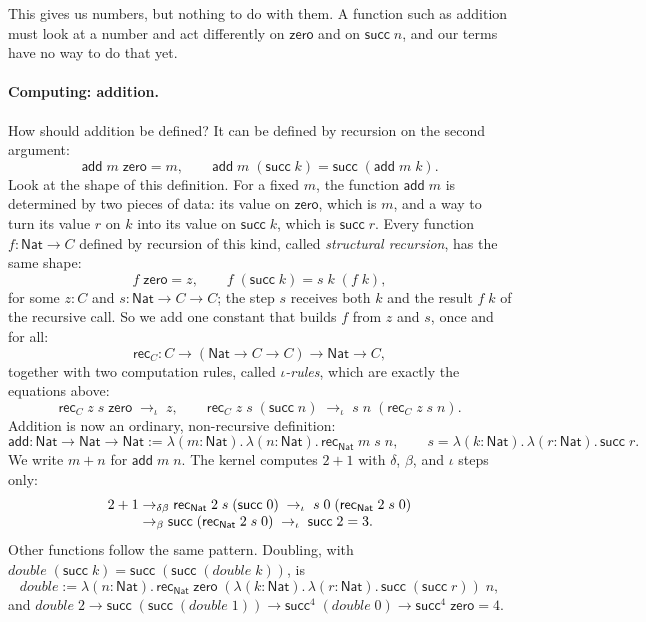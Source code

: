 \documentclass[acmsmall,screen,nonacm]{acmart}
\newcommand{\tLam}[3]{\lambda(#1{:}#2).\,#3}
\newcommand{\Nat}{\mathsf{Nat}}
\newcommand{\zero}{\mathsf{zero}}
\newcommand{\tsucc}{\mathsf{succ}}
\newcommand{\add}{\mathsf{add}}
\newcommand{\iotared}{\to_{\iota}}
\begin{document}
This gives us numbers, but nothing to do with them.
A function such as addition must look at a number and act differently on $\zero$ and on $\tsucc\;n$, and our terms have no way to do that yet.

\paragraph{Computing: addition.}
How should addition be defined?
It can be defined by recursion on the second argument:
\[
\add\;m\;\zero = m, \qquad \add\;m\;(\tsucc\;k) = \tsucc\;(\add\;m\;k).
\]
Look at the shape of this definition.
For a fixed $m$, the function $\add\;m$ is determined by two pieces of data:
its value on $\zero$, which is $m$, and a way to turn its value $r$ on $k$ into its value on $\tsucc\;k$, which is $\tsucc\;r$.
Every function $f : \Nat \to C$ defined by recursion of this kind, called \emph{structural recursion}, has the same shape:
\[
f\;\zero = z, \qquad f\;(\tsucc\;k) = s\;k\;(f\;k),
\]
for some $z : C$ and $s : \Nat \to C \to C$; the step $s$ receives both $k$ and the result $f\;k$ of the recursive call.
So we add one constant that builds $f$ from $z$ and $s$, once and for all:
\[
\mathsf{rec}_C : C \to (\Nat \to C \to C) \to \Nat \to C,
\]
together with two computation rules, called \emph{$\iota$-rules}, which are exactly the equations above:
\[
\mathsf{rec}_C\;z\;s\;\zero \;\iotared\; z,
\qquad
\mathsf{rec}_C\;z\;s\;(\tsucc\;n) \;\iotared\; s\;n\;(\mathsf{rec}_C\;z\;s\;n).
\]
Addition is now an ordinary, non-recursive definition:
\[
\add : \Nat \to \Nat \to \Nat \mathrel{:=} \tLam{m}{\Nat}{\tLam{n}{\Nat}{\mathsf{rec}_{\Nat}\;m\;s\;n}},
\qquad
s = \tLam{k}{\Nat}{\tLam{r}{\Nat}{\tsucc\;r}}.
\]
We write $m + n$ for $\add\;m\;n$.
The kernel computes $2 + 1$ with $\delta$, $\beta$, and $\iota$ steps only:
\[
\begin{array}{r@{\;}l}
2 + 1
&\to_{\delta\beta} \mathsf{rec}_{\Nat}\;2\;s\;(\tsucc\;0)
\;\iotared\; s\;0\;(\mathsf{rec}_{\Nat}\;2\;s\;0) \\
&\to_{\beta} \tsucc\;(\mathsf{rec}_{\Nat}\;2\;s\;0)
\;\iotared\; \tsucc\;2 = 3.
\end{array}
\]
Other functions follow the same pattern. Doubling, with $\mathit{double}\;(\tsucc\;k) = \tsucc\;(\tsucc\;(\mathit{double}\;k))$, is
\[
\mathit{double} \mathrel{:=} \tLam{n}{\Nat}{\mathsf{rec}_{\Nat}\;\zero\;(\tLam{k}{\Nat}{\tLam{r}{\Nat}{\tsucc\;(\tsucc\;r)}})\;n},
\]
and $\mathit{double}\;2 \to \tsucc\;(\tsucc\;(\mathit{double}\;1)) \to \tsucc^4\;(\mathit{double}\;0) \to \tsucc^4\;\zero = 4$.
\end{document}

